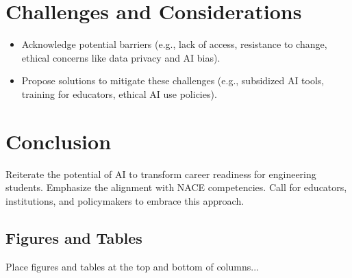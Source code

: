 \documentclass[conference]{IEEEtran}
\begin{document}

\section{Challenges and Considerations}
\begin{itemize}
    \item Acknowledge potential barriers (e.g., lack of access, resistance to change, ethical concerns like data privacy and AI bias).
    \item Propose solutions to mitigate these challenges (e.g., subsidized AI tools, training for educators, ethical AI use policies).
\end{itemize}

    

\section*{Conclusion}
Reiterate the potential of AI to transform career readiness for engineering students.
Emphasize the alignment with NACE competencies.
Call for educators, institutions, and policymakers to embrace this approach.

\subsection{Figures and Tables}
Place figures and tables at the top and bottom of columns...

\end{document}
